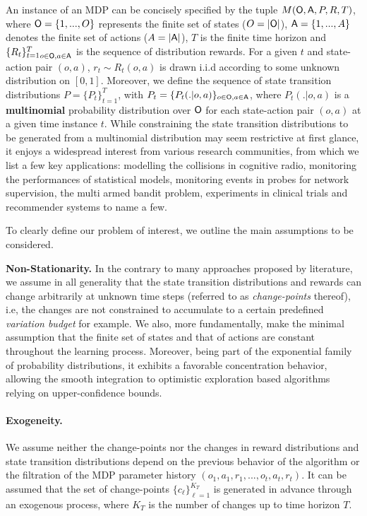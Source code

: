 \documentclass{article} %
\begin{document}

An instance of an MDP can be concisely specified by the tuple $M({\mathsf{O}}, {\mathsf{A}},  P, R, T)$, where ${\mathsf{O}} = \left\lbrace 1,..., O \right\rbrace$ represents the finite set of states ($ O= |{\mathsf{O}}|$), ${\mathsf{A}} = \left\lbrace 1,..., A \right\rbrace$ denotes the finite set of actions ($A = |{\mathsf{A}}|$), $T$ is the finite time horizon and ${\{R_t\}_{t=1}^T}_{o \in {\mathsf{O}}, a \in {\mathsf{A}}}$ is the sequence of distribution rewards. For a given $t$ and state-action pair $(o,a)$, $r_t \sim R_t(o, a)$ is drawn i.i.d according to some unknown distribution on $[0, 1]$. Moreover, we define the sequence of state transition distributions $P=\{P_t\}_{t=1}^T$, with $P_t = \{P_t(.|o, a)\}_{o \in {\mathsf{O}}, a \in {\mathsf{A}}}$, where $P_t(.|o, a)$ is a \textbf{multinomial} probability distribution over ${\mathsf{O}}$ for each state-action pair $(o,a)$ at a given time instance $t$. While constraining the state transition distributions to be generated from a multinomial distribution may seem restrictive at first glance, it enjoys a widespread interest from various research communities, from which we list a few key applications: modelling the collisions in cognitive radio, monitoring the performances of statistical models, monitoring events in probes for network supervision, the multi armed bandit problem, experiments in clinical trials and recommender systems to name a few.

To clearly define our problem of interest, we outline the main assumptions to be considered. 

\textbf{Non-Stationarity.} In the contrary to many approaches proposed by literature, we assume in all generality that the state transition distributions and rewards can change arbitrarily at unknown time steps (referred to as \textit{change-points} thereof), i.e, the changes are not constrained to accumulate to a certain predefined \textit{variation budget} for example. We also, more fundamentally, make the minimal assumption that the finite set of states and that of actions are constant throughout the learning process. Moreover, being part of the exponential family of probability distributions, it exhibits a favorable concentration behavior, allowing the smooth integration to optimistic exploration based algorithms relying on upper-confidence bounds.

\paragraph{Exogeneity.} We assume neither the change-points nor the changes in reward distributions and state transition distributions depend on the previous behavior of the algorithm or the filtration of the MDP parameter history $(o_1, a_1, r_1, ..., o_t, a_t, r_t)$. It can be assumed that the set of change-points $\{c_\ell\}_{\ell=1}^{K_T}$ is generated in advance through an exogenous process, where $K_T$ is the number of changes up to time horizon $T$.
\end{document}
